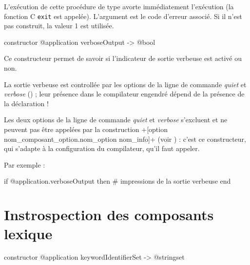 L'exécution de cette procédure de type avorte immédiatement l'exécution (la fonction C \texttt{exit} est appelée). L'argument est le code d'erreur associé. Si il n'est pas construit, la valeur 1 est utilisée.










\begin{galgasbox}
constructor @application verboseOutput -> @bool
\end{galgasbox}

Ce constructeur permet de savoir si l'indicateur de sortie verbeuse est activé ou non.

La sortie verbeuse est controllée par les options de la ligne de commande \emph{quiet} et \emph{verbose} () ; leur présence dans le compilateur engendré dépend de la présence de la déclaration \ggs!%

Les deux options de la ligne de commande \emph{quiet} et \emph{verbose} s'excluent et ne peuvent pas être appelées par la construction \ggs+[option nom_composant_option.nom_option nom_info]+ (voir ) : c'est ce constructeur, qui s'adapte à la configuration du compilateur, qu'il faut appeler.

Par exemple :
\begin{galgas}
if @application.verboseOutput then
  # impressions de la sortie verbeuse
end
\end{galgas}














\section{Instrospection des composants lexique}


\begin{galgasbox}
constructor @application keywordIdentifierSet -> @stringset
\end{galgasbox}


